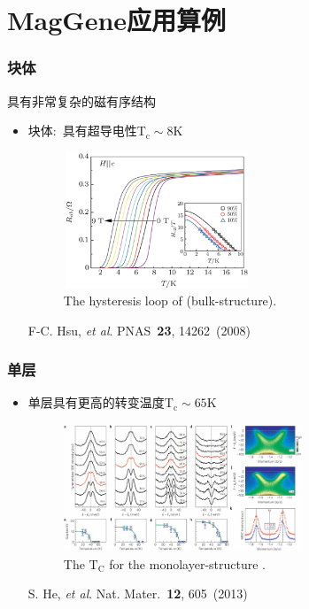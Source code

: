 \documentclass[cjk,slidestop,compress,mathserif,blue]{beamer}
\begin{document}
\section{\rm{MagGene}应用算例}
\frame
{
	\frametitle{块体\textrm{}}
	\textrm{}具有非常复杂的磁有序结构
	\begin{itemize}
		\item 块体\textrm{}:~具有超导电性$\mathrm{T_c}\sim8\mathrm{K}$
\begin{figure}[h!]
\centering
\includegraphics[height=1.6in,width=2.20in]{Figures/FeSe-Mag-Tc.png}
\caption{\tiny \textrm{The hysteresis loop of  (bulk-structure). }}%
\label{Fig:Mag-bulk-FeSe}
\end{figure}
\textrm{F-C. Hsu, \textit{et al}. PNAS \textbf{23}, 14262~(2008)}
	\end{itemize}
}

\frame
{
	\frametitle{单层\textrm{}}
	\begin{itemize}
		\item 单层\textrm{}具有更高的转变温度$\mathrm{T_c}\sim65\mathrm{K}$
\begin{figure}[h!]
\vspace*{-0.08in}
\centering
\includegraphics[height=1.5in,width=2.80in]{Figures/FeSe-single-Mag-Tc.png}
\caption{\tiny \textrm{The  $\mathrm{T_C}$ for the monolayer-structure .}}%
\label{Fig:Mag-surface-FeSe}
\end{figure}
\textrm{S. He, \textit{et al}.  Nat. Mater. \textbf{12}, 605~(2013)}
	\end{itemize}
}
\end{document}
